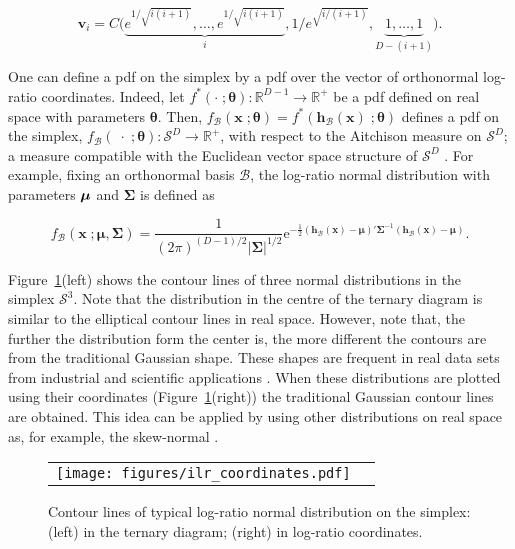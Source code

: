 \documentclass[12pt, a4paper]{article}
\newcommand{\m}[1]{\boldsymbol{#1}}
\begin{document}
\[
\textbf{v}_i = C\Big( \underbrace{e^{1/\sqrt{i(i+1)}}, \dots, e^{1/\sqrt{i(i+1)}}}_{i}, 1/e^{\sqrt{ i/(i+1)}}, \underbrace{1, \dots, 1}_{D-(i+1)} \Big).
\]


One can define a pdf on the simplex by a pdf over the vector of orthonormal log-ratio coordinates. Indeed, let $f^*(\cdot \;; \m\theta) : \mathbb{R}^{D-1} \rightarrow \mathbb{R}^+$ be a pdf defined on real space with parameters $\m\theta$. Then, $f_\mathcal{B}(\mathbf{x}\;; \m\theta) = f^*(\mathbf{h}_\mathcal{B}(\textbf{x})\;; \m\theta)$ defines a pdf on the simplex, $f_\mathcal{B}(\;\cdot\;; \m\theta): \mathcal{S}^D \rightarrow \mathbb{R}^+$, with respect to the Aitchison measure on $\mathcal{S}^D$; a measure compatible with the Euclidean vector space structure of $\mathcal{S}^D$ \citep{mateu2013normal}. For example, fixing an orthonormal basis $\mathcal{B}$, the log-ratio normal distribution with parameters $\mbox{\boldmath \(\mu\)}$ and $\mathbf{\Sigma}$ is defined as

\begin{equation}\label{eq:densSNormal}
f_\mathcal{B}(\mathbf{x}\;; \m\mu, \m\Sigma) =\frac{1}{(2\pi)^{(D-1)/2} |\mathbf{\Sigma}|^{1/2}} \text{e}^{ -{\frac{1}{2}} \left(\mathbf{h}_\mathcal{B}(\textbf{x})- \m\mu \right)' \mathbf{\Sigma}^{-1} \left( \mathbf{h}_\mathcal{B}(\textbf{x})- \m\mu \right)}.
\end{equation}

Figure~\ref{fig01}(left) shows the contour lines of three normal distributions in the simplex $\mathcal{S}^3$. Note that the distribution in the centre of the ternary diagram is similar to the elliptical contour lines in real space. However, note that, the further the distribution form the center is, the more different the contours are from the traditional Gaussian shape. These shapes are frequent in real data sets from industrial and scientific applications \citep{buccianti2011natural,vives2014individual}.
When these distributions are plotted using their coordinates (Figure~\ref{fig01}(right)) the traditional Gaussian contour lines are obtained. This idea can be applied by using other distributions on real space as, for example, the skew-normal  \citep{mateu2007skew}.


\begin{figure}[thbp]
\begin{center}
\begin{tabular}{cc}
  \texttt{[image: figures/ilr\_coordinates.pdf]} \\
 \end{tabular}
 \caption{Contour lines of typical log-ratio normal distribution on the simplex: (left) in the ternary diagram; (right) in log-ratio coordinates. }\label{fig01}
\end{center}
\end{figure}
\end{document}
